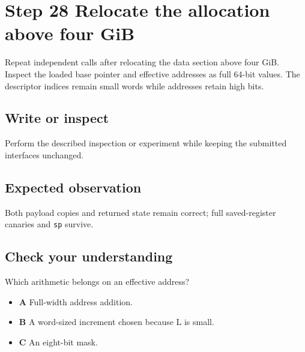\section{Step 28 Relocate the allocation above four GiB}\label{ring-s28}

Repeat independent calls after relocating the data section above four GiB. Inspect the loaded base pointer and effective addresses as full 64-bit values. The descriptor indices remain small words while addresses retain high bits.

\subsection{Write or inspect}
Perform the described inspection or experiment while keeping the submitted interfaces unchanged.

\subsection{Expected observation}
Both payload copies and returned state remain correct; full saved-register canaries and \texttt{sp} survive.

\subsection{Check your understanding}
Which arithmetic belongs on an effective address?

\begin{itemize}
  \item \textbf{A} Full-width address addition.
  \item \textbf{B} A word-sized increment chosen because L is small.
  \item \textbf{C} An eight-bit mask.
\end{itemize}
